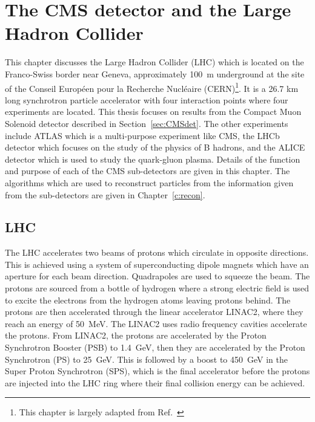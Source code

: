 \chapter{The CMS detector and the Large Hadron Collider}
\label{c:det}
This chapter discusses the Large Hadron Collider (LHC) which is located on the Franco-Swiss border near Geneva, approximately 100~m underground at the site of the Conseil Europ\'{e}en pour la Recherche Nucl\'{e}aire (CERN)\footnote{This chapter is largely adapted from Ref.~\cite{iopdetector}}. It is a 26.7 km long synchrotron particle accelerator with four interaction points where four experiments are located. This thesis focuses on results from the Compact Muon Solenoid detector described in Section~\ref{sec:CMSdet}. The other experiments include ATLAS which is a multi-purpose experiment like CMS, the LHCb detector which focuses on the study of the physics of B hadrons, and the ALICE detector which is used to study the quark-gluon plasma. Details of the function and purpose of each of the CMS sub-detectors are given in this chapter. The algorithms which are used to reconstruct particles from the information given from the sub-detectors are given in Chapter~\ref{c:recon}.

\section{LHC}

The LHC accelerates two beams of protons which circulate in opposite directions.
This is achieved using a system of superconducting dipole magnets which have an aperture for each beam direction. Quadrapoles are used to squeeze the beam. The protons are sourced from a bottle of hydrogen where a strong electric field is used to excite the electrons from the hydrogen atoms leaving protons behind. The protons are then accelerated through the linear accelerator LINAC2, where they reach an energy of 50~MeV. The LINAC2 uses radio frequency cavities accelerate the protons. From LINAC2, the protons are accelerated by the Proton Synchrotron Booster (PSB) to 1.4~GeV, then they are accelerated by the Proton Synchrotron (PS) to 25~GeV. This is followed by a boost to 450~GeV in the Super Proton Synchrotron (SPS), which is the final accelerator before the protons are injected into the LHC ring where their final collision energy can be achieved. 


